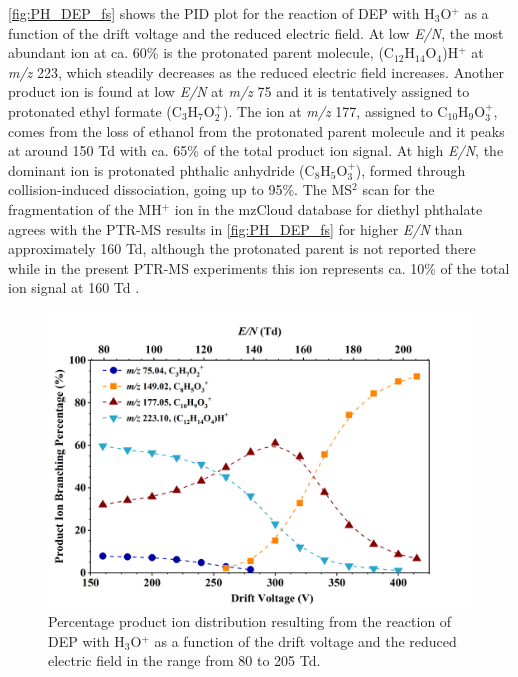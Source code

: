 \autoref{fig:PH_DEP_fs} shows the PID plot for the reaction of DEP with H$_3$O$^+$ as a function of the drift voltage and the reduced electric field.
At low \textit{E/N}, the most abundant ion at ca. 60\% is the protonated parent molecule, (C$_{12}$H$_{14}$O$_4$)H$^+$  at \textit{m/z} 223, which steadily decreases as the reduced electric field increases.
%
Another product ion is found at low \textit{E/N} at \textit{m/z} 75 and it is tentatively assigned to protonated ethyl formate (C$_3$H$_{7}$O$_2^+$).
The ion at \textit{m/z} 177, assigned to C$_{10}$H$_{9}$O$_3^+$, comes from the loss of ethanol from the protonated parent molecule and it peaks at around 150 Td with ca. 65\% of the total product ion signal.
At high \textit{E/N}, the dominant ion is protonated phthalic anhydride (C$_8$H$_{5}$O$_3^+$), formed through collision-induced dissociation, going up to 95\%. %
%
The MS$^2$ scan for the fragmentation of the MH$^+$ ion in the mzCloud database for diethyl phthalate agrees with the PTR-MS results in \autoref{fig:PH_DEP_fs} for higher \textit{E/N} than approximately 160 Td, although the protonated parent is not reported there while in the present PTR-MS experiments this ion represents ca. 10\% of the total ion signal at 160 Td
\cite{mzcloudDEP}.

\begin{figure}[htb]%
\centering
\includegraphics[height=0.35\textheight]{pics/DEP-BR.png}
\caption{Percentage product ion distribution resulting from the reaction of DEP with H$_3$O$^+$ as a function of the drift voltage and the reduced electric field in the range from 80 to 205 Td.}
\label{fig:PH_DEP_fs}
\end{figure}



